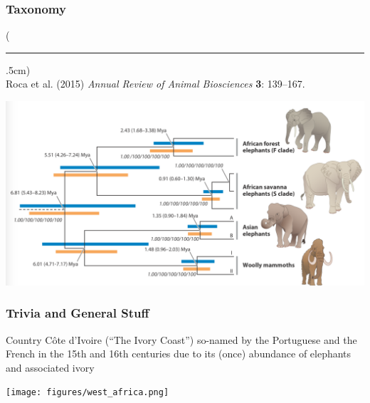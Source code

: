 \documentclass[10pt]{beamer}
\newenvironment{reference}[2]{%
	\begin{textblock*}{\textwidth}(#1,#2)
		\tiny\bgroup\color{gray}}{\egroup\end{textblock*}}
\begin{document}
\begin{frame}[t]
\frametitle{Taxonomy}
\vspace{0.25cm}

	\begin{reference}{4mm}{92mm}
		\rule{1.5cm}{0.25pt}\\
		Roca et al. (2015) \emph{Annual Review of Animal Biosciences} \textbf{3}: 139--167.
	\end{reference}

	\begin{center}
		\includegraphics[width=1.0\textwidth]{figures/elephant_tree.png}
	\end{center}
\end{frame}   


\begin{frame}[t]
\frametitle{Trivia and General Stuff}
\vspace{0.5cm}

	Country C\^{o}te d'Ivoire (``The Ivory Coast'') so-named by the Portuguese and the French in the 15th and 16th centuries due to its (once) abundance of elephants and associated ivory\\
	
	\vspace{0.5cm}
	
	\begin{center}
		\texttt{[image: figures/west\_africa.png]}
	\end{center}

\end{frame}
\end{document}
